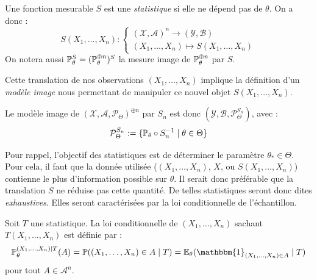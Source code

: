 \begin{definition}[Statistique]
    Une fonction mesurable $S$ est une \emph{statistique} si elle ne dépend pas 
    de $ \theta$. On a donc : 
        $$ 
            S(X_1, \dots, X_n) : 
                \begin{cases}
                    ( \mathcal{X}, \mathcal{A})^n \longrightarrow ( \mathcal{Y}, \mathcal{B}) \\ 
                    (X_1, \dots, X_n) \longmapsto S(X_1, \dots, X_n)
                \end{cases}
        $$ 
    On notera aussi $ \mathbb{P}_\theta^S = ( \mathbb{P}_\theta^{\oplus n})^S$ la mesure image de 
    $\mathbb{P}_\theta^{\oplus n}$ par $S$. 
\end{definition}

Cette translation de nos observations $(X_1, \dots, X_n)$ implique la définition d'un \emph{modèle image} 
nous permettant de manipuler ce nouvel objet $S(X_1, \dots, X_n)$. 

\begin{definition}
    Le modèle image de $( \mathcal{X}, \mathcal{A}, \mathcal{P}_\Theta)^{\oplus n}$ par $S_n$ 
    est donc $ ( \mathcal{Y}, \mathcal{B}, \mathcal{P}_\Theta^{S_n})$, avec : 
        \begin{equation}
            \mathcal{P}_\Theta^{S_n} := \{ \mathbb{P}_\theta \circ S_n^{-1} \mid \theta \in \Theta\}
        \end{equation}
\end{definition}

Pour rappel, l'objectif des statistiques est de déterminer le paramètre $ \theta_* \in \Theta$. 
Pour cela, il faut que la donnée utilisée ($(X_1, \dots, X_n)$, $X$, ou $S(X_1, \dots, X_n)$) contienne 
le plus d'information possible sur $ \theta$. 
Il serait donc préférable que la translation $S$ ne réduise pas cette quantité. De telles statistiques seront 
donc dites \emph{exhaustives}. Elles seront caractérisées par la loi conditionnelle de l'échantillon. 

\begin{definition}
    Soit $T$ une statistique. La loi conditionnelle de $(X_1, \dots, X_n)$ sachant 
    $T(X_1, \dots, X_n)$ est définie par : 
        \begin{equation}
            \myP_\theta^{(X_1, \dots, X_n) \mid T}(A) = \myP((X_1, \dots, X_n) \in A \mid T) 
            = \mathbb{E}_\theta( \mathbbm{1}_{(X_1, \dots, X_n) \in A} \mid T )
        \end{equation}
    pour tout $A \in \mathcal{A}^n$. 
\end{definition}

